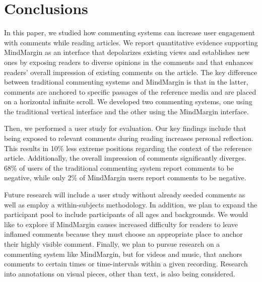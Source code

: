 \section{Conclusions}

In this paper, we studied how commenting systems can increase user engagement with comments while reading articles. We report quantitative evidence supporting MindMargin as an interface that depolarizes existing views and establishes new ones by exposing readers to diverse opinions in the comments and that enhances readers' overall impression of existing comments on the article. The key difference between traditional commenting systems and MindMargin is that in the latter, comments are anchored to specific passages of the reference media and are placed on a horizontal infinite scroll. We developed two commenting systems, one using the traditional vertical interface and the other using the MindMargin interface. 

Then, we performed a user study for evaluation. Our key findings include that being exposed to relevant comments during reading increases personal reflection. This results in 10\% less extreme positions regarding the context of the reference article. Additionally, the overall impression of comments significantly diverges. 68\% of users of the traditional commenting system report comments to be negative, while only 2\% of MindMargin users report comments to be negative. 

Future research will include a user study without already seeded comments as well as employ a within-subjects methodology. In addition, we plan to expand the participant pool to include participants of all ages and backgrounds. We would like to explore if MindMargin causes increased difficulty for readers to leave inflamed comments because they must choose an appropriate place to anchor their highly visible comment. Finally, we plan to pursue research on a commenting system like MindMargin, but for videos and music, that anchors comments to certain times or time-intervals within a given recording. Research into annotations on visual pieces, other than text, is also being considered.
